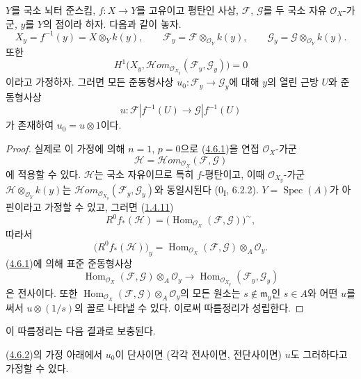 \begin{corollary}[4.6.2]
\label{III.4.6.2-fr}
$Y$를 국소 뇌터 준스킴, $f:X\to Y$를 고유이고 평탄인 사상,
$\mathcal F$, $\mathcal G$를 두 국소 자유 $\mathcal O_X$-가군,
$y$를 $Y$의 점이라 하자. 다음과 같이 놓자.
\[
X_y=f^{-1}(y)=X\otimes_Yk(y),\qquad
\mathcal F_y=\mathcal F\otimes_{\mathcal O_Y}k(y),\qquad
\mathcal G_y=\mathcal G\otimes_{\mathcal O_Y}k(y).
\]
또한
\[
\label{III.4.6.2.1-fr}
H^1\bigl(X_y,
\mathcal{H}\!om_{\mathcal O_{X_y}}(\mathcal F_y,\mathcal G_y)\bigr)=0
\tag{4.6.2.1}
\]
이라고 가정하자. 그러면 모든 준동형사상
$u_0:\mathcal F_y\to\mathcal G_y$에 대해 $y$의 열린 근방 $U$와
준동형사상
\[
u:\mathcal F|f^{-1}(U)\longrightarrow\mathcal G|f^{-1}(U)
\]
가 존재하여 $u_0=u\otimes1$이다.
\end{corollary}

\begin{proof}
실제로 이 가정에 의해 $n=1$, $p=0$으로
(\hyperref[III.4.6.1-fr]{4.6.1})을 연접 $\mathcal O_X$-가군
\[
\mathcal H=\mathcal{H}\!om_{\mathcal O_X}(\mathcal F,\mathcal G)
\]
에 적용할 수 있다. $\mathcal H$는 국소 자유이므로 특히
$f$-평탄이고, 이때 $\mathcal O_{X_y}$-가군
$\mathcal H\otimes_{\mathcal O_Y}k(y)$는
$\mathcal{H}\!om_{\mathcal O_{X_y}}(\mathcal F_y,\mathcal G_y)$와
동일시된다 (0\textsubscript{I}, 6.2.2). $Y=\operatorname{Spec}(A)$가
아핀이라고 가정할 수 있고, 그러면
(\hyperref[III.1.4.11-fr]{1.4.11})
\[
R^0f_*(\mathcal H)=
\bigl(\operatorname{Hom}_{\mathcal O_X}(\mathcal F,\mathcal G)\bigr)^\sim,
\]
따라서
\[
\bigl(R^0f_*(\mathcal H)\bigr)_y
=\operatorname{Hom}_{\mathcal O_X}(\mathcal F,\mathcal G)
\otimes_A\mathcal O_y.
\]
(\hyperref[III.4.6.1-fr]{4.6.1})에 의해 표준 준동형사상
\[
\operatorname{Hom}_{\mathcal O_X}(\mathcal F,\mathcal G)
\otimes_A\mathcal O_y
\longrightarrow
\operatorname{Hom}_{\mathcal O_{X_y}}(\mathcal F_y,\mathcal G_y)
\]
은 전사이다. 또한
$\operatorname{Hom}_{\mathcal O_X}(\mathcal F,\mathcal G)
\otimes_A\mathcal O_y$의 모든 원소는 $s\notin\mathfrak m_y$인
$s\in A$와 어떤 $u$를 써서 $u\otimes(1/s)$의 꼴로 나타낼 수 있다.
이로써 따름정리가 성립한다.
\end{proof}

이 따름정리는 다음 결과로 보충된다.

\begin{corollary}[4.6.3]
\label{III.4.6.3-fr}
(\hyperref[III.4.6.2-fr]{4.6.2})의 가정 아래에서 $u_0$이 단사이면
(각각 전사이면, 전단사이면) $u$도 그러하다고 가정할 수 있다.
\end{corollary}

